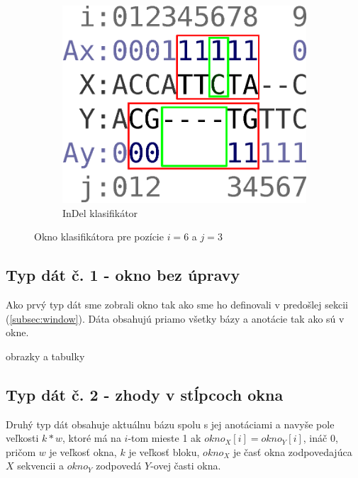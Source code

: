 \begin{figure}[h]
\begin{subfigure}[b]{0.35\textwidth}
                \includegraphics[width=\textwidth]{images/window_i}
                \caption{InDel klasifikátor}
                \label{fig:window-i}
        \end{subfigure}
        \caption[Okno klasifikátora]{Okno klasifikátora pre pozície $i = 6$ a $j = 3$}
\end{figure}


\subsection{Typ dát č. 1 - okno bez úpravy}
\label{subsec:datatype1}

Ako prvý typ dát sme zobrali okno tak ako sme ho definovali v predošlej sekcii (\ref{subsec:window}). Dáta obsahujú priamo všetky bázy a anotácie tak ako sú v okne.

\todo obrazky a tabulky


\subsection{Typ dát č. 2 - zhody v stĺpcoch okna}
\label{subsec:datatype2}

Druhý typ dát obsahuje aktuálnu bázu spolu s jej anotáciami a navyše pole veľkosti $k*w$, ktoré má na $i$-tom mieste 1 ak $okno_X[i] = okno_Y[i]$, ináč 0, pričom $w$ je veľkosť okna, $k$ je veľkosť bloku, $okno_X$ je časť okna zodpovedajúca $X$ sekvencii a $okno_Y$ zodpovedá $Y$-ovej časti okna.

